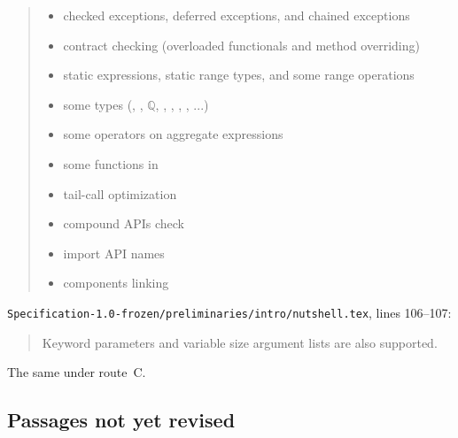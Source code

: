\begin{description}
\begin{quote}
\begin{itemize}
\item checked exceptions, deferred exceptions, and chained exceptions
\item contract checking (overloaded functionals and method overriding)
\item static expressions, static range types, and some range operations
\item some types (,
, $\mathbb{Q}$,
, , , , ...)
\item some operators on aggregate expressions
\item some functions in 
\item tail-call optimization
\item compound APIs check
\item import API names
\item components linking
\end{itemize}
\end{quote}
\nolinkurl{Specification-1.0-frozen/preliminaries/intro/nutshell.tex}, lines
106--107:
\begin{quote}
Keyword parameters and variable size argument lists
are also supported.
\end{quote}
\item[Route C] The same under route~C.
\end{description}

\subsection{Passages not yet revised}

